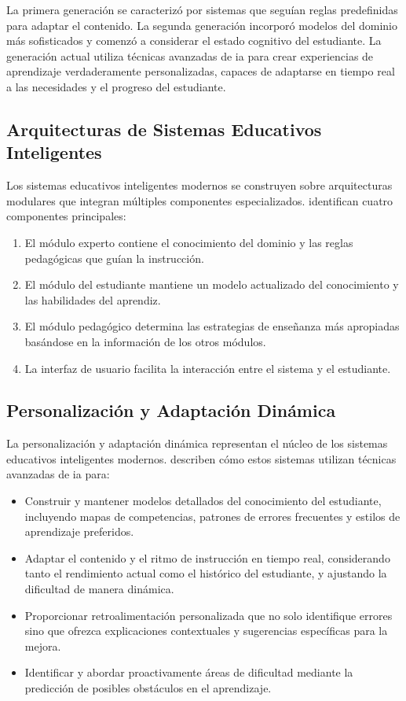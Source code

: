 La primera generación se caracterizó por sistemas que seguían reglas predefinidas para adaptar el contenido. La segunda generación incorporó modelos del dominio más sofisticados y comenzó a considerar el estado cognitivo del estudiante. La generación actual utiliza técnicas avanzadas de \gls{ia} para crear experiencias de aprendizaje verdaderamente personalizadas, capaces de adaptarse en tiempo real a las necesidades y el progreso del estudiante.

\subsection{Arquitecturas de Sistemas Educativos Inteligentes}
Los sistemas educativos inteligentes modernos se construyen sobre arquitecturas modulares que integran múltiples componentes especializados. \cite{anderson2020adaptive} identifican cuatro componentes principales:

\begin{enumerate}
  \item El módulo experto contiene el conocimiento del dominio y las reglas pedagógicas que guían la instrucción.
  \item El módulo del estudiante mantiene un modelo actualizado del conocimiento y las habilidades del aprendiz.
  \item El módulo pedagógico determina las estrategias de enseñanza más apropiadas basándose en la información de los otros módulos.
  \item La interfaz de usuario facilita la interacción entre el sistema y el estudiante.
\end{enumerate}

\subsection{Personalización y Adaptación Dinámica}
La personalización y adaptación dinámica representan el núcleo de los sistemas educativos inteligentes modernos. \cite{roll2018learning} describen cómo estos sistemas utilizan técnicas avanzadas de \gls{ia} para:

\begin{itemize}
  \item Construir y mantener modelos detallados del conocimiento del estudiante, incluyendo mapas de competencias, patrones de errores frecuentes y estilos de aprendizaje preferidos.

  \item Adaptar el contenido y el ritmo de instrucción en tiempo real, considerando tanto el rendimiento actual como el histórico del estudiante, y ajustando la dificultad de manera dinámica.

  \item Proporcionar retroalimentación personalizada que no solo identifique errores sino que ofrezca explicaciones contextuales y sugerencias específicas para la mejora.

  \item Identificar y abordar proactivamente áreas de dificultad mediante la predicción de posibles obstáculos en el aprendizaje.
\end{itemize}

